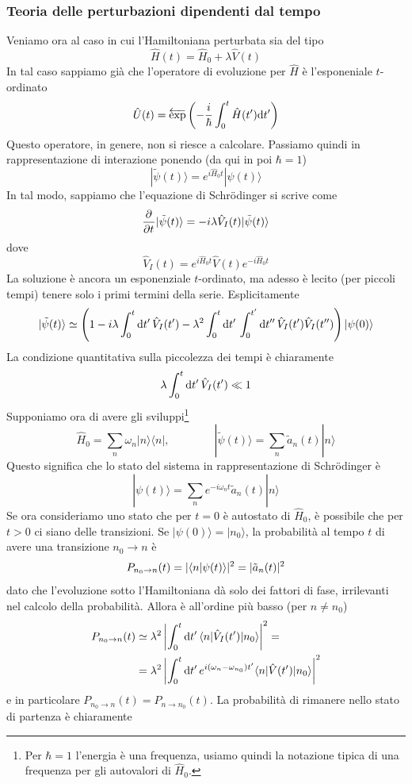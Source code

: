 \documentclass[a4paper, 11pt]{article}
\newcommand{\op}[1]{\hat{#1}}
\renewcommand{\op}[1]{\hat{#1}}
\newcommand{\ham}{\hat{H}}
\renewcommand{\ket}[1]{| #1\rangle}
\renewcommand{\bra}[1]{\langle #1|}
\begin{document}
\subsubsection{Teoria delle perturbazioni dipendenti dal tempo}
Veniamo ora al caso in cui l'Hamiltoniana perturbata sia del tipo
\[\ham(t)=\ham_0+\lambda\op V(t)\]
In tal caso sappiamo già che l'operatore di evoluzione per $\ham$ è l'esponeniale $t$-ordinato
\[\op U(t)=\overleftarrow{\exp}\left(-\frac{i}{\hbar}\int_0^t\ham(t')\d t'\right)\]
Questo operatore, in genere, non si riesce a calcolare. Passiamo quindi in rappresentazione di interazione ponendo (da qui in poi $\hbar=1$)
\[\ket{\tilde{\psi}(t)}=e^{i\ham_0t}\ket{\psi(t)}\]
In tal modo, sappiamo che l'equazione di Schr\"odinger si scrive come
\[\pder{}{t}\ket{\tilde{\psi}(t)}=-i\lambda\op V_I(t)\ket{\tilde{\psi}(t)}\]
dove
\[\op V_I(t)=e^{i\ham_0t}\op V(t)e^{-i\ham_0t}\]
La soluzione è ancora un esponenziale $t$-ordinato, ma adesso è lecito (per piccoli tempi) tenere solo i primi termini della serie. Esplicitamente
\[\ket{\tilde{\psi}(t)}\simeq\left(1-i\lambda\int_{0}^{t}\d t'\,\op V_I(t')-\lambda^2\int_{0}^{t}\d t'\,\int_{0}^{t'}\d t''\,\op V_I(t')\op V_I(t'')\right)\ket{\psi(0)}\]
La condizione quantitativa sulla piccolezza dei tempi è chiaramente
\[\lambda\int_{0}^{t}\d t'\,\op V_I(t')\ll1\]
Supponiamo ora di avere gli sviluppi\footnote{Per $\hbar=1$ l'energia è una frequenza, usiamo quindi la notazione tipica di una frequenza per gli autovalori di $\ham_0$.}
\[\ham_0=\sum_{n}\omega_n\ket n\bra n,\qquad\qquad\ket{\tilde{\psi}(t)}=\sum_{n}\tilde a_n(t)\ket n\]
Questo significa che lo stato del sistema in rappresentazione di Schr\"odinger è
\[\ket{\psi(t)}=\sum_{n}e^{-i\omega_nt}\tilde a_n(t)\ket n\]
Se ora consideriamo uno stato che per $t=0$ è autostato di $\ham_0$, è possibile che per $t>0$ ci siano delle transizioni. Se $\ket{\psi(0)}=\ket{n_0}$, la probabilità al tempo $t$ di avere una transizione $n_0\to n$ è
\[P_{n_0\to n}(t)=|\langle n\vert\psi(t)\rangle|^2=|\tilde{a}_n(t)|^2\]
dato che l'evoluzione sotto l'Hamiltoniana dà solo dei fattori di fase, irrilevanti nel calcolo della probabilità. Allora è all'ordine più basso (per $n\neq n_0$)
\begin{align*}P_{n_0\to n}(t)&\simeq\lambda^2\left|\int_{0}^{t}\d t'\,\braketop{n}{\op V_I(t')}{n_0}\right|^2=\\&=\lambda^2\left|\int_{0}^{t}\d t'\,e^{i(\omega_n-\omega_{n_0})t'}\braketop{n}{\op V(t')}{n_0}\right|^2\end{align*}
e in particolare $P_{n_0\to n}(t)=P_{n\to n_0}(t)$. La probabilità di rimanere nello stato di partenza è chiaramente
\end{document}
